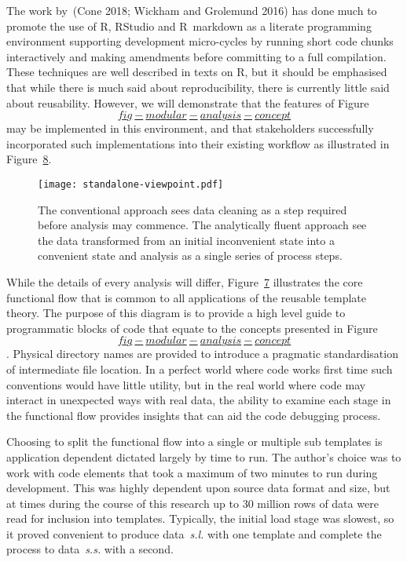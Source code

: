 \documentclass[
]{article}
\begin{document}
The work by~(Cone 2018; Wickham and Grolemund 2016) has done much to
promote the use of R, RStudio and R~markdown as a literate programming
environment supporting development micro-cycles by running short code
chunks interactively and making amendments before committing to a full
compilation. These techniques are well described in texts on R, but it
should be emphasised that while there is much said about
reproducibility, there is currently little said about reusability.
However, we will demonstrate that the features of
Figure~\protect\hyperlink{fig-modular-analysis-concept}{\[fig-modular-analysis-concept\]}
may be implemented in this environment, and that stakeholders
successfully incorporated such implementations into their existing
workflow as illustrated in
Figure~\protect\hyperlink{fig:standalone-viewpoint}{8}.

\begin{figure}
\hypertarget{fig:standalone-viewpoint}{%
\centering
\texttt{[image: standalone-viewpoint.pdf]}
\caption{The conventional approach sees data cleaning as a step required
before analysis may commence. The analytically fluent approach see the
data transformed from an initial inconvenient state into a convenient
state and analysis as a single series of process
steps.}\label{fig:standalone-viewpoint}
}
\end{figure}

While the details of every analysis will differ,
Figure~\protect\hyperlink{fig_core_functional_flow}{7} illustrates the
core functional flow that is common to all applications of the reusable
template theory. The purpose of this diagram is to provide a high level
guide to programmatic blocks of code that equate to the concepts
presented in
Figure~\protect\hyperlink{fig-modular-analysis-concept}{\[fig-modular-analysis-concept\]}.
Physical directory names are provided to introduce a pragmatic
standardisation of intermediate file location. In a perfect world where
code works first time such conventions would have little utility, but in
the real world where code may interact in unexpected ways with real
data, the ability to examine each stage in the functional flow provides
insights that can aid the code debugging process.

Choosing to split the functional flow into a single or multiple sub
templates is application dependent dictated largely by time to run. The
author's choice was to work with code elements that took a maximum of
two minutes to run during development. This was highly dependent upon
source data format and size, but at times during the course of this
research up to 30 million rows of data were read for inclusion into
templates. Typically, the initial load stage was slowest, so it proved
convenient to produce data~\emph{s.l.} with one template and complete
the process to data~\emph{s.s.} with a second.
\end{document}
